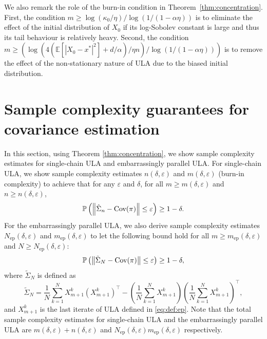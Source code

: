 \documentclass[12pt,reqno]{amsart}
\theoremstyle{remark}
\theoremstyle{definition}
\newcommand{\E}{\mathbb{E}}
\renewcommand{\Pr}{\mathbb{P}}
\newcommand{\Cov}{\textnormal{Cov}}
\renewcommand{\epsilon}{\varepsilon}
\begin{document}
We also remark the role of the burn-in condition in Theorem~\ref{thm:concentration}.
First, the condition $m\ge \log(\kappa_{0}/\eta)/\log(1/(1-\alpha\eta))$ is to eliminate the effect of the initial distribution of $X_{0}$ if its log-Sobolev constant is large and thus its tail behaviour is relatively heavy.
Second, the condition $m\ge \left(\log(4(\E[|X_{0}-x^{\ast}|^{2}]+d/\alpha)/\eta n)/\log(1/(1-\alpha\eta))\right)$ is to remove the effect of the non-stationary nature of ULA due to the biased initial distribution.


\section{Sample complexity guarantees for covariance estimation}\label{sec:appl}
In this section, using Theorem \ref{thm:concentration}, we show sample complexity estimates for single-chain ULA and  embarrassingly parallel ULA.
For single-chain ULA, we show sample complexity estimates $n(\delta,\epsilon)$ and $m(\delta,\epsilon)$ (burn-in complexity) to achieve that for any $\epsilon$ and $\delta$, for all $m\ge m(\delta,\epsilon)$ and $n\ge n(\delta,\epsilon)$,
\begin{equation*}
    \Pr\left(\left\|\hat{\Sigma}_{n}-\Cov(\pi)\right\|\le \epsilon\right)\ge 1-\delta.
\end{equation*}
For the embarrassingly parallel ULA, we also derive sample complexity estimates $N_{\text{ep}}(\delta,\epsilon)$ and $m_{\text{ep}}(\delta,\epsilon)$ to let the following bound hold for all $m\ge m_{\text{ep}}(\delta,\epsilon)$ and $N\ge N_{\text{ep}}(\delta,\epsilon)$:
\begin{equation*}
    \Pr\left(\left\|\tilde{\Sigma}_{N}-\Cov(\pi)\right\|\le \epsilon\right)\ge 1-\delta,
\end{equation*}
where $\tilde{\Sigma}_{N}$ is defined as
\begin{equation*}
    \tilde{\Sigma}_{N}=\frac{1}{N}\sum_{k=1}^{N}X_{m+1}^{k}(X_{m+1}^{k})^{\top}-\left(\frac{1}{N}\sum_{k=1}^{N}X_{m+1}^{k}\right)\left(\frac{1}{N}\sum_{k=1}^{N}X_{m+1}^{k}\right)^{\top},
\end{equation*}
and $X_{m+1}^{k}$ is the last iterate of ULA defined in \eqref{eq:def:ep}.
Note that the total sample complexity estimates for single-chain ULA and the embarrassingly parallel ULA are $m(\delta,\epsilon)+n(\delta,\epsilon)$ and $N_{\text{ep}}(\delta,\epsilon)m_{\text{ep}}(\delta,\epsilon)$ respectively.
\end{document}
